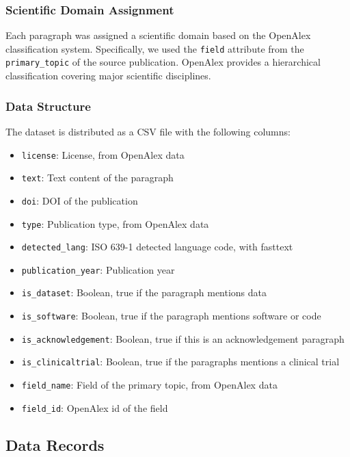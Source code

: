 \documentclass[
]{article}
\providecommand{\tightlist}{%
  \setlength{\itemsep}{0pt}\setlength{\parskip}{0pt}}
\begin{document}
\hypertarget{scientific-domain-assignment}{%
\subsubsection{Scientific Domain
Assignment}\label{scientific-domain-assignment}}

Each paragraph was assigned a scientific domain based on the OpenAlex
classification system. Specifically, we used the \texttt{field}
attribute from the \texttt{primary\_topic} of the source publication.
OpenAlex provides a hierarchical classification covering major
scientific disciplines.

\hypertarget{data-structure}{%
\subsubsection{Data Structure}\label{data-structure}}

The dataset is distributed as a CSV file with the following columns:

\begin{itemize}
\tightlist
\item
  \texttt{license}: License, from OpenAlex data
\item
  \texttt{text}: Text content of the paragraph
\item
  \texttt{doi}: DOI of the publication
\item
  \texttt{type}: Publication type, from OpenAlex data
\item
  \texttt{detected\_lang}: ISO 639-1 detected language code, with
  fasttext
\item
  \texttt{publication\_year}: Publication year
\item
  \texttt{is\_dataset}: Boolean, true if the paragraph mentions data
\item
  \texttt{is\_software}: Boolean, true if the paragraph mentions
  software or code
\item
  \texttt{is\_acknowledgement}: Boolean, true if this is an
  acknowledgement paragraph
\item
  \texttt{is\_clinicaltrial}: Boolean, true if the paragraphs mentions a
  clinical trial
\item
  \texttt{field\_name}: Field of the primary topic, from OpenAlex data
\item
  \texttt{field\_id}: OpenAlex id of the field
\end{itemize}

\hypertarget{data-records}{%
\subsection{Data Records}\label{data-records}}
\end{document}

